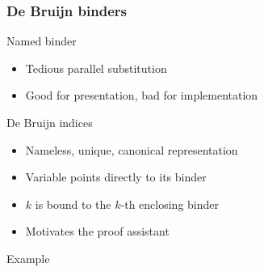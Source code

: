 \documentclass[xcolor={usenames,dvipsnames}]{beamer}
\begin{document}
\begin{frame}
  \frametitle{De Bruijn binders}
  \begin{block}{Named binder}
    \begin{itemize}
      \item Tedious parallel substitution
      \item Good for presentation, bad for implementation
    \end{itemize}
  \end{block}

  \begin{block}{De Bruijn indices}
    \begin{itemize}
      \item Nameless, unique, canonical representation
      \item Variable points directly to its binder
      \item $k$ is bound to the $k$-th enclosing binder
      \item Motivates the proof assistant
    \end{itemize}
  \end{block}

  \begin{block}{Example}
    \begin{center}
      \LARGE{
      }
    \end{center}
  \end{block}

\end{frame}
\end{document}
